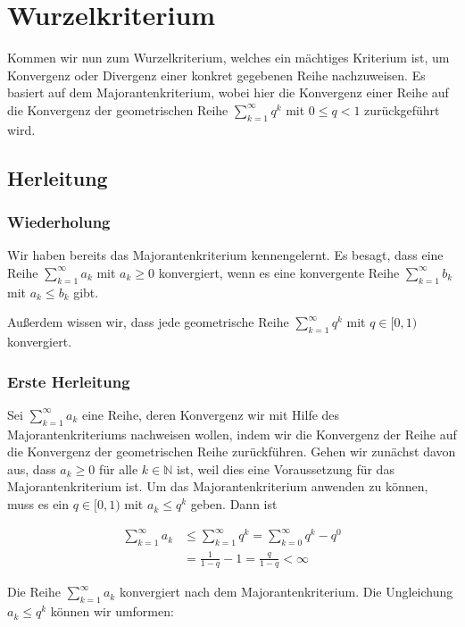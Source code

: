 \documentclass[fontsize=9pt,
               parskip=half-,
               DIV=14,
               listof=chapterentry,
               tocflat]{scrbook}
\begin{document}
\chapter{Wurzelkriterium}

Kommen wir nun zum Wurzelkriterium, welches ein mächtiges Kriterium ist, um Konvergenz oder Divergenz einer konkret gegebenen Reihe nachzuweisen. Es basiert auf dem Majorantenkriterium, wobei hier die Konvergenz einer Reihe auf die Konvergenz der geometrischen Reihe $\sum _{k=1}^{\infty }q^{k}$ mit $0\leq q<1$ zurückgeführt wird.



\section{Herleitung}

\subsection{Wiederholung}

Wir haben bereits das Majorantenkriterium kennengelernt. Es besagt, dass eine Reihe $\sum _{k=1}^{\infty }a_{k}$ mit $a_{k}\geq 0$ konvergiert, wenn es eine konvergente Reihe $\sum _{k=1}^{\infty }b_{k}$ mit $a_{k}\leq b_{k}$ gibt.

Außerdem wissen wir, dass jede geometrische Reihe $\sum _{k=1}^{\infty }q^{k}$ mit $q\in [0,1)$ konvergiert.

\subsection{Erste Herleitung}

Sei $\sum _{k=1}^{\infty }a_{k}$ eine Reihe, deren Konvergenz wir mit Hilfe des Majorantenkriteriums nachweisen wollen, indem wir die Konvergenz der Reihe auf die Konvergenz der geometrischen Reihe zurückführen. Gehen wir zunächst davon aus, dass $a_{k}\geq 0$ für alle $k\in \mathbb {N} $ ist, weil dies eine Voraussetzung für das Majorantenkriterium ist. Um das Majorantenkriterium anwenden zu können, muss es ein $q\in [0,1)$ mit $a_{k}\leq q^{k}$ geben. Dann ist

\begin{align*}
\sum _{k=1}^{\infty }a_{k}&\leq \sum _{k=1}^{\infty }q^{k}=\sum _{k=0}^{\infty }q^{k}-q^{0}\\[0.3em]&={\frac {1}{1-q}}-1={\frac {q}{1-q}}<\infty 
\end{align*}

Die Reihe $\sum _{k=1}^{\infty }a_{k}$ konvergiert nach dem Majorantenkriterium. Die Ungleichung $a_{k}\leq q^{k}$ können wir umformen:
\end{document}

